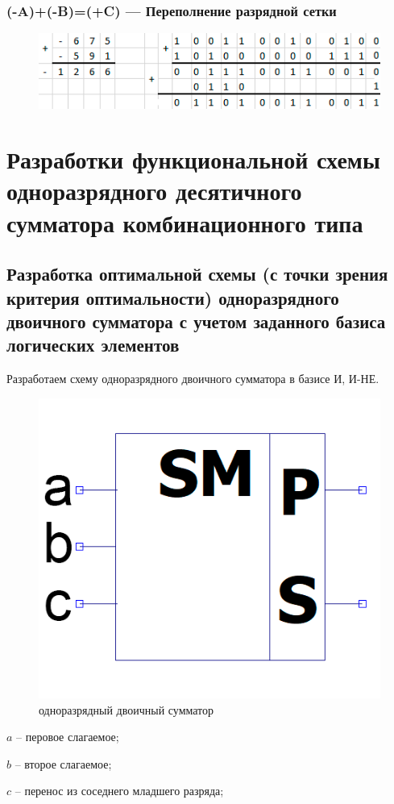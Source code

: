 \documentclass[a4paper,14pt]{article}
\begin{document}
\subsubsection{(-A)+(-B)=(+C) — Переполнение разрядной сетки}


\begin{figure}[H]
	\centering
	\includegraphics[width=0.7\linewidth]{primeri/pr_6_2}
	\caption{}
	\label{fig:screenshot006}
\end{figure}

\section{Разработки функциональной схемы одноразрядного десятичного сумматора комбинационного типа}

\subsection{Разработка оптимальной схемы (с точки зрения критерия оптимальности) одноразрядного двоичного сумматора с учетом заданного базиса логических элементов}

Разработаем схему одноразрядного двоичного сумматора в базисе И, И-НЕ.

\begin{figure}[H]
	\centering
	\includegraphics[width=0.3\linewidth]{images/dvSum_el}
	\caption{одноразрядный двоичный сумматор}
	\label{fig:dvSum_el}
\end{figure}

$a$ -- перовое слагаемое;

$b$ -- второе слагаемое;

$c$ -- перенос из соседнего младшего разряда;
\end{document}
